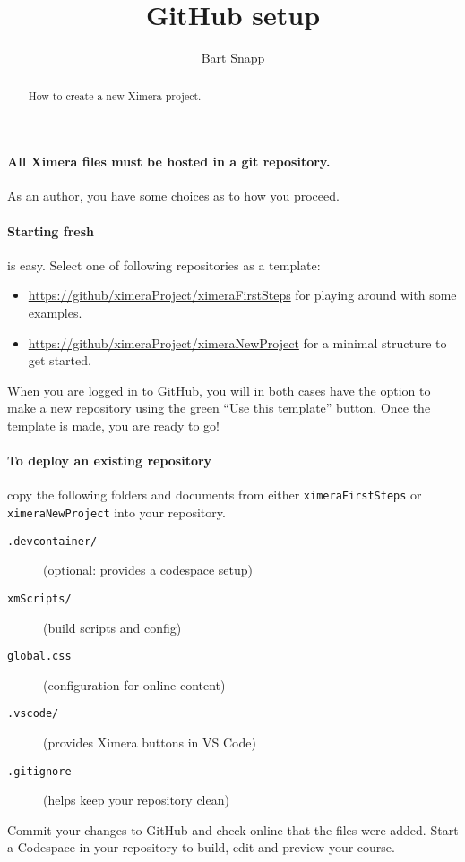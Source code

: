 \documentclass{ximera}
\title{GitHub setup}
\author{Bart Snapp}
\begin{document}
\begin{abstract}
    How to create a new Ximera project.
\end{abstract}
\maketitle

\paragraph{All Ximera files must be hosted in a git repository.}
As an author, you have some choices as to how you proceed.

\paragraph{Starting fresh} is easy.
Select one of following repositories as a template:
\begin{itemize}
    \item \url{https://github/ximeraProject/ximeraFirstSteps} for playing around with some examples.
    \item \url{https://github/ximeraProject/ximeraNewProject} for a minimal structure to get started.
\end{itemize}
When you are logged in to GitHub, you
will in both cases have the option to make a new repository using the green ``Use this
template'' button. Once the template is made, you are ready to go!

\paragraph{To deploy an existing repository} copy the
following folders and documents from either \verb!ximeraFirstSteps! or \verb!ximeraNewProject!
into your repository.
        \begin{description}
            \item[\texttt{.devcontainer/}] (optional: provides a codespace setup) 
            \item[\texttt{xmScripts/}]  (build scripts and config)
            \item[\texttt{global.css}] (configuration for online content)
            \item[\texttt{.vscode/}]  (provides Ximera buttons in VS Code)
            \item[\texttt{.gitignore}]	(helps keep your repository clean)
        \end{description}
Commit your changes to GitHub and check online that the files were added.
Start a Codespace in your repository to build, edit and preview your course.
\end{document}
